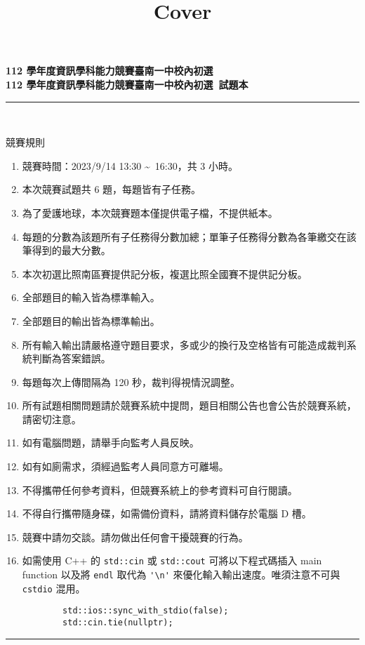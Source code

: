 \documentclass[a4paper]{article}
\title{Cover}
\begin{document}
\begin{center}
\textbf{\huge 112 學年度資訊學科能力競賽臺南一中校內初選}\\
\vspace{5mm}
\textbf{\huge 112 學年度資訊學科能力競賽臺南一中校內初選\ 試題本}\\
\vspace{10mm}
\rule{17cm}{2pt}\\
\vspace{5mm}

\huge 競賽規則\\
\end{center}

\fontsize{14pt}{20pt}\selectfont
\begin{enumerate}
    \setlength\itemsep{0.5pt}
    \item 競賽時間：2023/9/14 13:30 \textasciitilde \, 16:30，共 3 小時。
    \item 本次競賽試題共 6 題，每題皆有子任務。
    \item 為了愛護地球，本次競賽題本僅提供電子檔，不提供紙本。
    \item 每題的分數為該題所有子任務得分數加總；單筆子任務得分數為各筆繳交在該筆得到的最大分數。
    \item 本次初選比照南區賽提供記分板，複選比照全國賽不提供記分板。
    \item 全部題目的輸入皆為標準輸入。
    \item 全部題目的輸出皆為標準輸出。
    \item 所有輸入輸出請嚴格遵守題目要求，多或少的換行及空格皆有可能造成裁判系統判斷為答案錯誤。
    \item 每題每次上傳間隔為 120 秒，裁判得視情況調整。
    \item 所有試題相關問題請於競賽系統中提問，題目相關公告也會公告於競賽系統，請密切注意。
    \item 如有電腦問題，請舉手向監考人員反映。
    \item 如有如廁需求，須經過監考人員同意方可離場。
    \item 不得攜帶任何參考資料，但競賽系統上的參考資料可自行閱讀。
    \item 不得自行攜帶隨身碟，如需備份資料，請將資料儲存於電腦 D 槽。
    \item 競賽中請勿交談。請勿做出任何會干擾競賽的行為。
    \item 如需使用 C++ 的 \lstinline{std::cin} 或 \lstinline{std::cout} 可將以下程式碼插入 main function 以及將 \lstinline{endl} 取代為 \lstinline{'\n'} 來優化輸入輸出速度。唯須注意不可與 \lstinline{cstdio} 混用。
        \begin{lstlisting}
        std::ios::sync_with_stdio(false);
        std::cin.tie(nullptr);
        \end{lstlisting}

\end{enumerate}

\begin{center}
\rule{17cm}{2pt}\\
\end{center}
\end{document}
